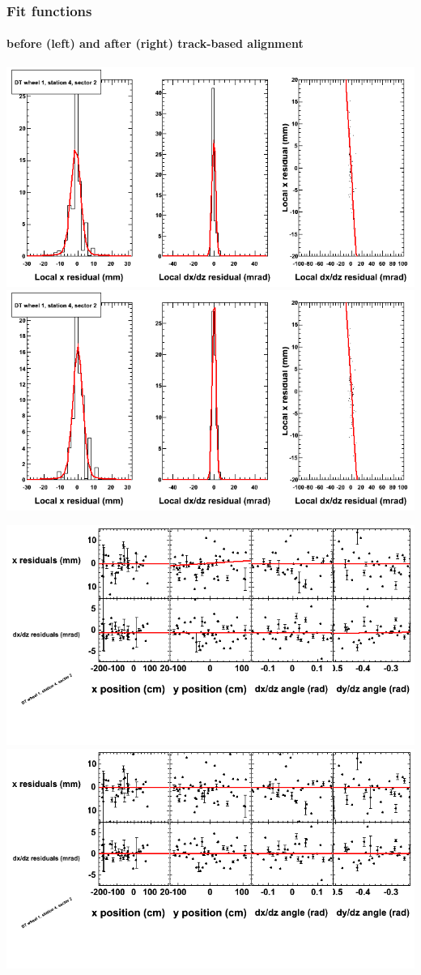 \documentclass[compress]{beamer}
\begin{document}
\begin{frame}
\frametitle{Fit functions}
\framesubtitle{before (left) and after (right) track-based alignment}
\includegraphics[width=0.5\linewidth]{fitfunctions_re01/MBwhDst4sec02_bellcurves.png} \includegraphics[width=0.5\linewidth]{fitfunctions_re05/MBwhDst4sec02_bellcurves.png}

\includegraphics[width=0.5\linewidth]{fitfunctions_re01/MBwhDst4sec02_polynomials.png} \includegraphics[width=0.5\linewidth]{fitfunctions_re05/MBwhDst4sec02_polynomials.png}
\end{frame}
\end{document}
